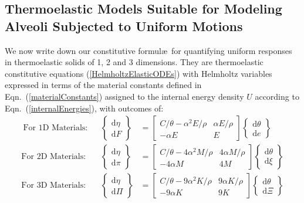 \subsection{Thermoelastic Models Suitable for Modeling Alveoli Subjected to Uniform Motions}

We now write down our constitutive formul\ae\ for quantifying uniform responses in thermo\-elastic solids of 1, 2 and 3 dimensions.  They are thermo\-elastic constitutive equations (\ref{HelmholtzElasticODEs}) with Helmholtz variables expressed in terms of the material constants defined in Eqn.~(\ref{materialConstants}) assigned to the internal energy density $U$ according to Eqn.~(\ref{internalEnergies}), with outcomes of:
\begin{subequations}
    \label{HelmholtzCEs}
    \begin{align}\
    \text{For 1D Materials:} & &
    \left\{ \begin{matrix}
    \mathrm{d} \eta \\ \mathrm{d} F
    \end{matrix} \right\} & = \begin{bmatrix}
    C / \theta - \alpha^2 E / \rho& 
    \alpha E / \rho \\
    -\alpha E & E
    \end{bmatrix} \left\{ \begin{matrix}
    \mathrm{d} \theta \\ \mathrm{d} e
    \end{matrix} \right\} \label{Helmholtz1D} \\
    \text{For 2D Materials:} & &
    \left\{ \begin{matrix}
    \mathrm{d} \eta \\ \mathrm{d} \pi
    \end{matrix} \right\} & = \begin{bmatrix}
    C / \theta - 4 \alpha^2 M / \rho & 
    4 \alpha M / \rho \\
    -4 \alpha M & 4 M
    \end{bmatrix} \left\{ \begin{matrix}
    \mathrm{d} \theta \\ \mathrm{d} \xi
    \end{matrix} \right\} \label{Helmholtz2D} \\
    \text{For 3D Materials:} & &
    \left\{ \begin{matrix}
    \mathrm{d} \eta \\ \mathrm{d} \Pi
    \end{matrix} \right\} & = \begin{bmatrix}
    C / \theta - 9 \alpha^2 K / \rho & 
    9 \alpha K / \rho \\
    -9 \alpha K & 9 K
    \end{bmatrix} \left\{ \begin{matrix}
    \mathrm{d} \theta \\ \mathrm{d} \Xi
    \end{matrix} \right\} \label{Helmholtz3D}
    \end{align}
\end{subequations}
